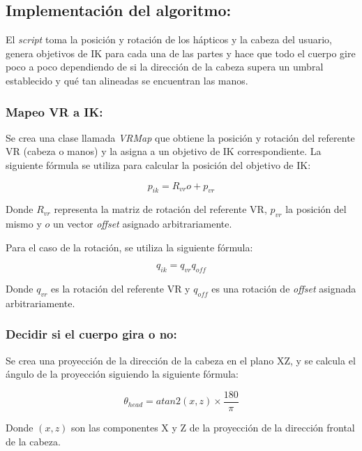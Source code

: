 \subsection{Implementación del algoritmo:}

El \textit{script} toma la posición y rotación de los hápticos y la cabeza del usuario, genera objetivos de IK para cada una de las partes y hace que todo el cuerpo gire poco a poco dependiendo de si la dirección de la cabeza 
supera un umbral establecido y qué tan alineadas se encuentran las manos.
\subsubsection{Mapeo VR a IK:}
Se crea una clase llamada \textit{VRMap} que obtiene la posición y rotación del referente VR (cabeza o manos) y la asigna a un objetivo de IK correspondiente.
La siguiente fórmula se utiliza para calcular la posición del objetivo de IK:

\begin{equation}
    p_{ik} = R_{vr}o + p_{vr}
\end{equation}

Donde $R_{vr}$ representa la matriz de rotación del referente VR, $p_{vr}$ la posición del mismo y $o$ un vector \textit{offset} asignado arbitrariamente.

Para el caso de la rotación, se utiliza la siguiente fórmula:

\begin{equation}
    q_{ik} = q_{vr}q_{off}
\end{equation}

Donde $q_{vr}$ es la rotación del referente VR y $q_{off}$ es una rotación de \textit{offset} asignada arbitrariamente.

\subsubsection{Decidir si el cuerpo gira o no:}

Se crea una proyección de la dirección de la cabeza en el plano XZ, y se calcula el ángulo de la proyección siguiendo la siguiente fórmula:

\begin{equation}
    \theta_{head} = atan2(x, z) \times \frac{180}{\pi}
\end{equation}

Donde $(x, z)$ son las componentes X y Z de la proyección de la dirección frontal de la cabeza.

